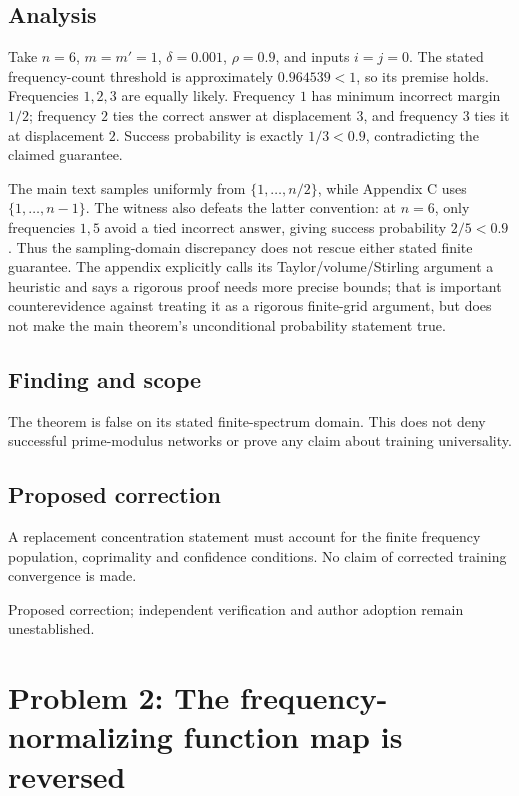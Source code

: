 \documentclass[11pt]{article}
\begin{document}
\subsection*{Analysis}

Take \(n=6\), \(m=m'=1\), \(\delta=0.001\), \(\rho=0.9\), and inputs \(i=j=0\). The stated frequency-count threshold is approximately \(0.964539<1\), so its premise holds. Frequencies \(1,2,3\) are equally likely. Frequency \(1\) has minimum incorrect margin \(1/2\); frequency \(2\) ties the correct answer at displacement \(3\), and frequency \(3\) ties it at displacement \(2\). Success probability is exactly \(1/3<0.9\), contradicting the claimed guarantee.

The main text samples uniformly from \(\{1,\ldots,n/2\}\), while Appendix C uses \(\{1,\ldots,n-1\}\). The witness also defeats the latter convention: at \(n=6\), only frequencies \(1,5\) avoid a tied incorrect answer, giving success probability \(2/5<0.9\). Thus the sampling-domain discrepancy does not rescue either stated finite guarantee. The appendix explicitly calls its Taylor/volume/Stirling argument a heuristic and says a rigorous proof needs more precise bounds; that is important counterevidence against treating it as a rigorous finite-grid argument, but does not make the main theorem’s unconditional probability statement true.

\subsection*{Finding and scope}

The theorem is false on its stated finite-spectrum domain. This does not deny successful prime-modulus networks or prove any claim about training universality.

\subsection*{Proposed correction}

A replacement concentration statement must account for the finite frequency population, coprimality and confidence conditions. No claim of corrected training convergence is made.

Proposed correction; independent verification and author adoption remain unestablished.

\section*{Problem 2: The frequency-normalizing function map is reversed}
\end{document}
